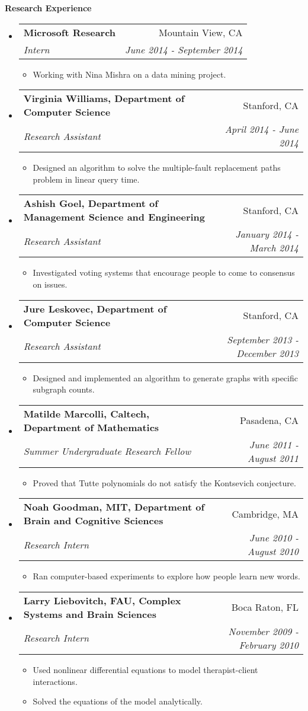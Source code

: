 \documentclass[letterpaper,11pt]{article}
\makeatletter
\newcommand{\resitem}[1]{\item #1 \vspace{-2pt}}
\newcommand{\resheading}[1]{{\large \colorbox{mygrey}{\begin{minipage}{\textwidth}{\textbf{#1 \vphantom{p\^{E}}}}\end{minipage}}}}
\newcommand{\ressubheading}[4]{
\begin{tabular*}{7.0in}{l@{\extracolsep{\fill}}r}
		\textbf{#1} & #2 \\
		\textit{#3} & \textit{#4}\\
\end{tabular*}\vspace{-6pt}}
\makeatother
\begin{document}
\resheading{Research Experience}
\begin{itemize}
\item
	\ressubheading{Microsoft Research}{Mountain View, CA}{Intern}{June 2014 - September 2014}
	\begin{itemize}
		\resitem{Working with Nina Mishra on a data mining project.}
	\end{itemize}
\item
	\ressubheading{Virginia Williams, Department of Computer Science}{Stanford, CA}{Research Assistant}{April 2014 - June 2014}
	\begin{itemize}
		\resitem{Designed an algorithm to solve the multiple-fault replacement paths problem in linear query time.}
	\end{itemize}
\item
	\ressubheading{Ashish Goel, Department of Management Science and Engineering}{Stanford, CA}{Research Assistant}{January 2014 - March 2014}
	\begin{itemize}
		\resitem{Investigated voting systems that encourage people to come to consensus on issues.}
	\end{itemize}
\item
	\ressubheading{Jure Leskovec, Department of Computer Science}{Stanford, CA}{Research Assistant}{September 2013 - December 2013}
	\begin{itemize}
		\resitem{Designed and implemented an algorithm to generate graphs with specific subgraph counts.}
	\end{itemize}
\item
	\ressubheading{Matilde Marcolli, Caltech, Department of Mathematics}{Pasadena, CA}{Summer Undergraduate Research Fellow}{June 2011 - August 2011}
	\begin{itemize}
		\resitem{Proved that Tutte polynomials do not satisfy the Kontsevich conjecture.}
	\end{itemize}
	
\item
	\ressubheading{Noah Goodman, MIT, Department of Brain and Cognitive Sciences}{Cambridge, MA}{Research Intern}{June 2010 - August 2010}
	\begin{itemize}
		\resitem{Ran computer-based experiments to explore how people learn new words.}
	\end{itemize}
	

\item
	\ressubheading{Larry Liebovitch, FAU, Complex Systems and Brain Sciences}{Boca Raton, FL}{Research Intern}{November 2009 - February 2010}
	\begin{itemize}
		\resitem{Used nonlinear differential equations to model therapist-client interactions.}
		\resitem{Solved the equations of the model analytically.}
	\end{itemize}



\end{itemize}
\end{document}
